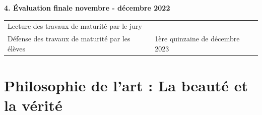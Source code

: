 \documentclass[
  10pt,
  french,
  a5paper,
  openany]{book}
\begin{document}

\textbf{4. Évaluation finale \hfill novembre - décembre 2022}

\begin{longtable}[]{@{}ll@{}}
\toprule
\endhead
\begin{minipage}[t]{0.56\columnwidth}\raggedright
Lecture des travaux de maturité par le jury\strut
\end{minipage} & \begin{minipage}[t]{0.38\columnwidth}\raggedright
\strut
\end{minipage}\tabularnewline
\begin{minipage}[t]{0.56\columnwidth}\raggedright
Défense des travaux de maturité par les élèves\strut
\end{minipage} & \begin{minipage}[t]{0.38\columnwidth}\raggedright
1ère quinzaine de décembre 2023\strut
\end{minipage}\tabularnewline
\bottomrule
\end{longtable}


\renewcommand{\chaptermark}[1]{\markboth{\footnotesize\space#1}{}}
\pagestyle{themes}

\hypertarget{philosophie-de-lart-la-beautuxe9-et-la-vuxe9rituxe9}{%
\chapter{Philosophie de l'art : La beauté et la vérité}\label{philosophie-de-lart-la-beautuxe9-et-la-vuxe9rituxe9}}
\end{document}

